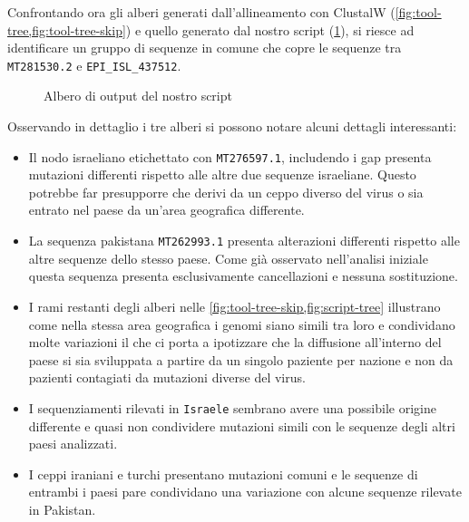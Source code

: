 \documentclass[11pt,italian]{article}
\begin{document}
\vspace{3mm}
\noindent
Confrontando ora gli alberi generati dall'allineamento con ClustalW (\cref{fig:tool-tree,fig:tool-tree-skip}) e quello generato dal nostro script (\cref{fig:script-tree}), si riesce ad identificare un gruppo di sequenze in comune che copre le sequenze tra \lstinline{MT281530.2} e \lstinline{EPI_ISL_437512}.

\begin{figure}[]
  \caption{Albero di output del nostro script}
  \label{fig:script-tree}
\end{figure}

\vspace{2mm}
\noindent
Osservando in dettaglio i tre alberi si possono notare alcuni dettagli interessanti:
\begin{itemize}
  \item Il nodo israeliano etichettato con \lstinline{MT276597.1}, includendo i gap presenta mutazioni differenti rispetto alle altre due sequenze israeliane. Questo potrebbe far presupporre che derivi da un ceppo diverso del virus o sia entrato nel paese da un'area geografica differente.
  \item La sequenza pakistana \lstinline{MT262993.1} presenta alterazioni differenti rispetto alle altre sequenze dello stesso paese. Come già osservato nell'analisi iniziale questa sequenza presenta esclusivamente cancellazioni e nessuna sostituzione.
  \item I rami restanti degli alberi nelle \cref{fig:tool-tree-skip,fig:script-tree} illustrano come nella stessa area geografica i genomi siano simili tra loro e condividano molte variazioni il che ci porta a ipotizzare che la diffusione all'interno del paese si sia sviluppata a partire da un singolo paziente per nazione e non da pazienti contagiati da mutazioni diverse del virus.
  \item I sequenziamenti rilevati in \lstinline{Israele} sembrano avere una possibile origine differente e quasi non condividere mutazioni simili con le sequenze degli altri paesi analizzati.
  \item I ceppi iraniani e turchi presentano mutazioni comuni e le sequenze di entrambi i paesi pare condividano una variazione con alcune sequenze rilevate in Pakistan.
\end{itemize}
\end{document}
